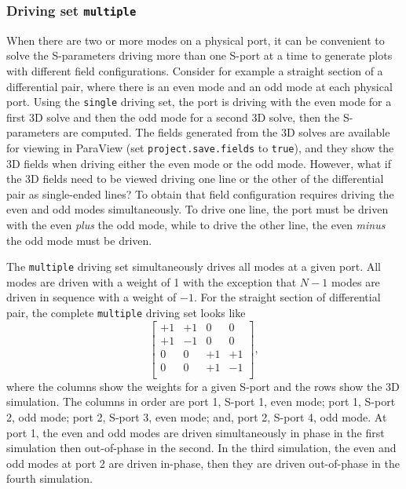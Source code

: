 \documentclass[titlepage]{article}
\renewcommand\_{\textunderscore\linebreak[1]}
\begin{document}
\subsubsection{Driving set \texttt{multiple}}

When there are two or more modes on a physical port, it can be convenient to solve the S-parameters driving more than one S-port at a time to generate plots with different field configurations.  Consider for example a straight section of a differential pair, where there is an even mode and an odd mode at each physical port.  Using the \texttt{single} driving set, the port is driving with the even mode for a first 3D solve and then the odd mode for a second 3D solve, then the S-parameters are computed.  The fields generated from the 3D solves are available for viewing in ParaView \cite{ParaView} (set \texttt{project.save.fields} to \texttt{true}), and they show the 3D fields when driving either the even mode or the odd mode.  However, what if the 3D fields need to be viewed driving one line or the other of the differential pair as single-ended lines?  To obtain that field configuration requires driving the even and odd modes simultaneously.  To drive one line, the port must be driven with the even \textit{plus} the odd mode, while to drive the other line, the even \textit{minus} the odd mode must be driven.

The \texttt{multiple} driving set simultaneously drives all modes at a given port.  All modes are driven with a weight of 1 with the exception that $N-1$ modes are driven in sequence with a weight of $-1$.  For the straight section of differential pair, the complete \texttt{multiple} driving set looks like
\begin{equation}
\left[ \begin{array}{cccc}
  +1 & +1 & 0 & 0 \\
  +1 & -1 & 0 & 0 \\
  0 & 0 & +1 & +1 \\
  0 & 0 & +1 & -1 \\
\end{array} \right],
\end{equation}
where the columns show the weights for a given S-port and the rows show the 3D simulation.  The columns in order are port 1, S-port 1, even mode; port 1, S-port 2, odd mode; port 2, S-port 3, even mode; and, port 2, S-port 4, odd mode.  At port 1, the even and odd modes are driven simultaneously in phase in the first simulation then out-of-phase in the second.  In the third simulation, the even and odd modes at port 2 are driven in-phase, then they are driven out-of-phase in the fourth simulation. 
\end{document}
